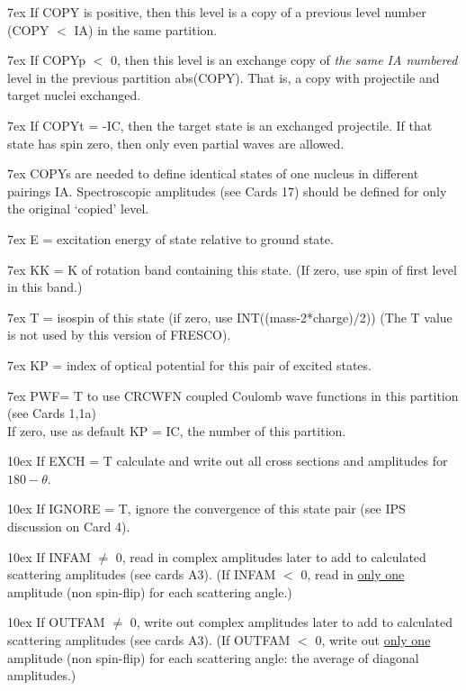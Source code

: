 \documentclass[11pt]{article}
\begin{document}
\hangindent 7ex
If COPY is positive, then this level is a copy of a
previous level number (COPY $<$ IA) in the same partition.

\hangindent 7ex
If COPYp $<$ 0, then this level is an exchange copy of
{\em the same IA numbered}
level in the previous partition abs(COPY).
That is, a copy with projectile and target nuclei exchanged.

\hangindent 7ex
If COPYt = -IC, then the target state is an exchanged projectile.
If that state has spin zero, then only even partial waves are allowed.

\hangindent 7ex
COPYs are needed to define identical states of one nucleus in different
pairings IA.   Spectroscopic amplitudes (see Cards 17) should be defined
for only the original `copied' level.

\hangindent 7ex
E     = excitation energy of state relative to ground state.

\hangindent 7ex
KK    = K of rotation band containing this state.
(If zero, use spin of first level in this band.)

\hangindent 7ex
T     = isospin of this state (if zero, use INT((mass-2*charge)/2))
(The T value is not used by this version of FRESCO).

\hangindent 7ex
KP = index of optical potential for this pair of excited states.

\hangindent 7ex
PWF= T to use CRCWFN  coupled Coulomb wave functions in this
partition (see Cards 1,1a)
\\
If zero, use as default KP = IC, the number of this partition.

\hangindent 10ex
If EXCH = T calculate and write out all cross sections and amplitudes
for $180-\theta$.


\hangindent 10ex
If IGNORE = T, ignore the convergence of this  state pair
(see IPS discussion on Card 4).

\hangindent 10ex
If INFAM $\ne$ 0,  read in complex amplitudes later to add to
calculated scattering amplitudes (see cards A3).
(If INFAM $<$ 0, read in \underline{only one} amplitude (non spin-flip)
for each scattering angle.)

\hangindent 10ex
If OUTFAM $\ne$ 0,  write out complex amplitudes later to add to
calculated scattering amplitudes (see cards A3).
(If OUTFAM $<$ 0, write out \underline{only one} amplitude (non spin-flip)
for each scattering angle: the average of diagonal amplitudes.)
\end{document}

